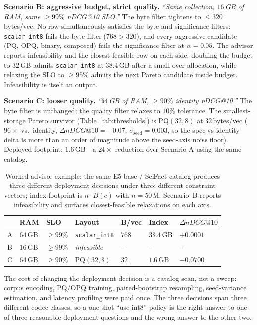 \documentclass[sigconf]{acmart}
\makeatletter
\newcommand{\ndcg}{nDCG@10}
\makeatother
\begin{document}
\textbf{Scenario B: aggressive budget, strict quality.}
\emph{``Same collection, $16$\,GB of RAM, same $\ge 99\%$ \ndcg{} SLO.''}
The byte filter tightens to $\le 320$\,bytes/vec. No row simultaneously satisfies the byte and significance filters: \texttt{scalar\_int8} fails the byte filter ($768 > 320$), and every aggressive candidate (PQ, OPQ, binary, composed) fails the significance filter at $\alpha{=}0.05$. The advisor reports infeasibility and the closest-feasible row on each side: doubling the budget to $32$\,GB admits \texttt{scalar\_int8} at $38.4$\,GB after a small over-allocation, while relaxing the SLO to $\ge 95\%$ admits the next Pareto candidate inside budget. Infeasibility is itself an output.

\textbf{Scenario C: looser quality.}
\emph{``$64$\,GB of RAM, $\ge 90\%$ identity \ndcg{}.''}
The byte filter is unchanged; the quality filter relaxes to $10\%$ tolerance. The smallest-storage Pareto survivor (Table~\ref{tab:thresholds}) is $\mathrm{PQ}(32, 8)$ at $32$\,bytes/vec ($96\times$ vs.\ identity, $\Delta\ndcg{} = -0.07$, $\sigma_{\text{seed}} = 0.003$, so the spec-vs-identity delta is more than an order of magnitude above the seed-axis noise floor). Deployed footprint: $1.6$\,GB---a $24\times$ reduction over Scenario A using the same catalog.

\begin{table}[t]
\centering
\small
\caption{Worked advisor example: the same E5-base / SciFact catalog produces three different deployment decisions under three different constraint vectors; index footprint is $n \cdot B(c)$ with $n = 50$\,M. Scenario~B reports infeasibility and surfaces closest-feasible relaxations on each axis.}
\label{tab:advisor-example}
\begin{tabular}{lllllll}
\toprule
 & RAM & SLO & Layout & B/vec & Index & $\Delta\ndcg{}$ \\
\midrule
A & $64$\,GB & $\ge 99\%$ & \texttt{scalar\_int8}      & $768$ & $38.4$\,GB & $+0.0001$ \\
B & $16$\,GB & $\ge 99\%$ & \emph{infeasible}          & --    & --         & -- \\
C & $64$\,GB & $\ge 90\%$ & $\mathrm{PQ}(32,8)$        & $32$  & $1.6$\,GB  & $-0.0700$ \\
\bottomrule
\end{tabular}
\end{table}

The cost of changing the deployment decision is a catalog scan, not a sweep: corpus encoding, PQ/OPQ training, paired-bootstrap resampling, seed-variance estimation, and latency profiling were paid once. The three decisions span three different codec classes, so a one-shot ``use int8'' policy is the right answer to one of three reasonable deployment questions and the wrong answer to the other two.
\end{document}
